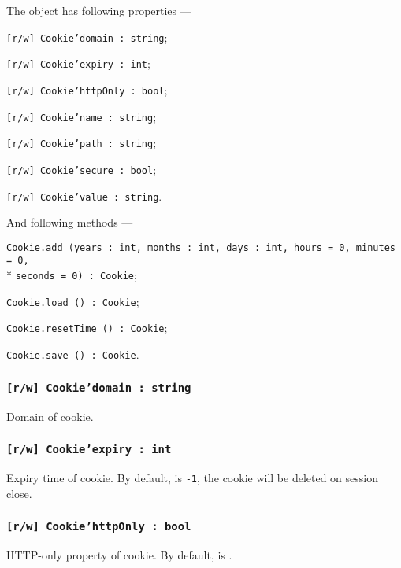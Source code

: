 The object \cookie{} has following properties —
\begin{icItems}
	\item \texttt{[r/w] Cookie'domain : string};
	\item \texttt{[r/w] Cookie'expiry : int};
	\item \texttt{[r/w] Cookie'httpOnly : bool};
	\item \texttt{[r/w] Cookie'name : string};
	\item \texttt{[r/w] Cookie'path : string};
	\item \texttt{[r/w] Cookie'secure : bool};
	\item \texttt{[r/w] Cookie'value : string}.
\end{icItems}

And following methods —
\begin{icItems}
	\item \texttt{Cookie.add (years : int, months : int, days : int, hours = 0, minutes = 0,}\\* \texttt{seconds = 0) : Cookie};
	\item \texttt{Cookie.load () : Cookie};
	\item \texttt{Cookie.resetTime () : Cookie};
	\item \texttt{Cookie.save () : Cookie}.
\end{icItems}

\subsubsection{\texttt{[r/w] Cookie'domain : string}}

Domain of cookie.

\subsubsection{\texttt{[r/w] Cookie'expiry : int}}

Expiry time of cookie. By default, is \texttt{-1}, the cookie will be deleted on session close.

\subsubsection{\texttt{[r/w] Cookie'httpOnly : bool}}

HTTP-only property of cookie. By default, is \false.

